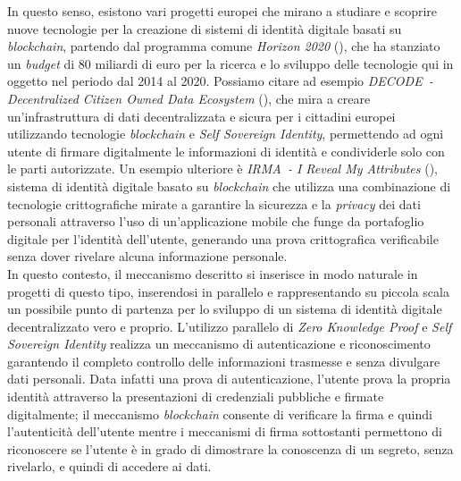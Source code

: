 In questo senso, esistono vari progetti europei che mirano a studiare e scoprire nuove tecnologie per la creazione di sistemi di identità digitale basati su \textit{blockchain}, partendo dal programma comune \textit{Horizon 2020} (\cite{site:horizon2020}),
che ha stanziato un \textit{budget} di 80 miliardi di euro per la ricerca e lo sviluppo delle tecnologie qui in oggetto nel periodo dal 2014 al 2020.
Possiamo citare ad esempio \textit{DECODE~- Decentralized Citizen Owned Data Ecosystem} (\cite{site:decode}), che mira a creare un'infrastruttura di dati decentralizzata e sicura per i cittadini europei
utilizzando tecnologie \textit{blockchain} e \textit{Self Sovereign Identity}, permettendo ad ogni utente di firmare digitalmente le informazioni di identità e condividerle solo con le parti autorizzate.
Un esempio ulteriore è \textit{IRMA~- I Reveal My Attributes} (\cite{site:irma}), sistema di identità digitale basato su \textit{blockchain} che utilizza una combinazione di tecnologie crittografiche mirate a garantire la sicurezza e la \textit{privacy} dei dati personali attraverso l'uso di un'applicazione mobile 
che funge da portafoglio digitale per l'identità dell'utente, generando una prova crittografica verificabile senza dover rivelare alcuna informazione personale. \\

In questo contesto, il meccanismo descritto si inserisce in modo naturale in progetti di questo tipo, inserendosi in parallelo e rappresentando su piccola scala un possibile punto di partenza per lo sviluppo di un sistema di identità digitale decentralizzato vero e proprio.
L'utilizzo parallelo di \textit{Zero Knowledge Proof} e \textit{Self Sovereign Identity} realizza un meccanismo di autenticazione e riconoscimento garantendo il completo controllo delle informazioni trasmesse e senza divulgare dati personali.
Data infatti una prova di autenticazione, l'utente prova la propria identità attraverso la presentazioni di credenziali pubbliche e firmate digitalmente; il meccanismo \textit{blockchain} consente di verificare la firma e quindi l'autenticità dell'utente
mentre i meccanismi di firma sottostanti permettono di riconoscere se l'utente è in grado di dimostrare la conoscenza di un segreto, senza rivelarlo, e quindi di accedere ai dati. \\

